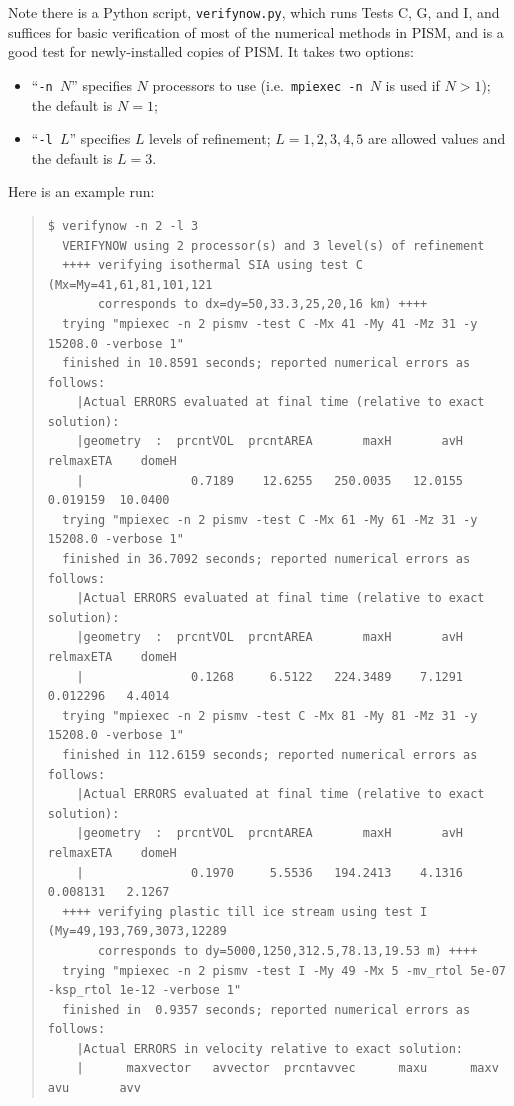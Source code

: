 \documentclass[11pt,final]{amsart}
\begin{document}
Note there is a Python script, \verb|verifynow.py|, which runs Tests C, G, and I, and suffices for basic verification of most of the numerical methods in PISM, and is a good test for newly-installed copies of PISM.  It takes two options:\begin{itemize}
\item ``\verb|-n |$N$'' specifies $N$ processors to use (i.e.~\verb|mpiexec -n |$N$ is used if $N>1$); the default is $N=1$;
\item ``\verb|-l |$L$'' specifies $L$ levels of refinement; $L=1,2,3,4,5$ are allowed values and the default is $L=3$.
\end{itemize}
Here is an example run:
\scriptsize\begin{quote}\begin{verbatim}
$ verifynow -n 2 -l 3
  VERIFYNOW using 2 processor(s) and 3 level(s) of refinement
  ++++ verifying isothermal SIA using test C (Mx=My=41,61,81,101,121
       corresponds to dx=dy=50,33.3,25,20,16 km) ++++
  trying "mpiexec -n 2 pismv -test C -Mx 41 -My 41 -Mz 31 -y 15208.0 -verbose 1"
  finished in 10.8591 seconds; reported numerical errors as follows:
    |Actual ERRORS evaluated at final time (relative to exact solution):
    |geometry  :  prcntVOL  prcntAREA       maxH       avH   relmaxETA    domeH
    |               0.7189    12.6255   250.0035   12.0155    0.019159  10.0400
  trying "mpiexec -n 2 pismv -test C -Mx 61 -My 61 -Mz 31 -y 15208.0 -verbose 1"
  finished in 36.7092 seconds; reported numerical errors as follows:
    |Actual ERRORS evaluated at final time (relative to exact solution):
    |geometry  :  prcntVOL  prcntAREA       maxH       avH   relmaxETA    domeH
    |               0.1268     6.5122   224.3489    7.1291    0.012296   4.4014
  trying "mpiexec -n 2 pismv -test C -Mx 81 -My 81 -Mz 31 -y 15208.0 -verbose 1"
  finished in 112.6159 seconds; reported numerical errors as follows:
    |Actual ERRORS evaluated at final time (relative to exact solution):
    |geometry  :  prcntVOL  prcntAREA       maxH       avH   relmaxETA    domeH
    |               0.1970     5.5536   194.2413    4.1316    0.008131   2.1267
  ++++ verifying plastic till ice stream using test I (My=49,193,769,3073,12289
       corresponds to dy=5000,1250,312.5,78.13,19.53 m) ++++
  trying "mpiexec -n 2 pismv -test I -My 49 -Mx 5 -mv_rtol 5e-07 -ksp_rtol 1e-12 -verbose 1"
  finished in  0.9357 seconds; reported numerical errors as follows:
    |Actual ERRORS in velocity relative to exact solution:
    |      maxvector   avvector  prcntavvec      maxu      maxv       avu       avv

\end{verbatim}
\end{quote}
\end{document}
